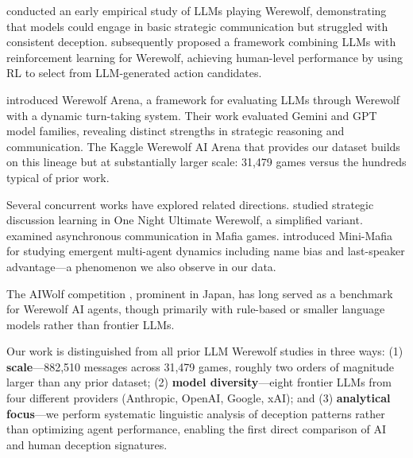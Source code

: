 \citet{xu2023exploring} conducted an early empirical study of LLMs playing Werewolf, demonstrating that models could engage in basic strategic communication but struggled with consistent deception. \citet{xu2024language} subsequently proposed a framework combining LLMs with reinforcement learning for Werewolf, achieving human-level performance by using RL to select from LLM-generated action candidates.

\citet{bailis2024werewolf} introduced Werewolf Arena, a framework for evaluating LLMs through Werewolf with a dynamic turn-taking system. Their work evaluated Gemini and GPT model families, revealing distinct strengths in strategic reasoning and communication. The Kaggle Werewolf AI Arena that provides our dataset builds on this lineage but at substantially larger scale: 31,479 games versus the hundreds typical of prior work.

Several concurrent works have explored related directions. \citet{jin2025learning} studied strategic discussion learning in One Night Ultimate Werewolf, a simplified variant. \citet{eckhaus2025timetotalk} examined asynchronous communication in Mafia games. \citet{costa2025minimafia} introduced Mini-Mafia for studying emergent multi-agent dynamics including name bias and last-speaker advantage---a phenomenon we also observe in our data.

The AIWolf competition \citep{toriumi2017aiwolf}, prominent in Japan, has long served as a benchmark for Werewolf AI agents, though primarily with rule-based or smaller language models rather than frontier LLMs.

Our work is distinguished from all prior LLM Werewolf studies in three ways: (1) \textbf{scale}---882,510 messages across 31,479 games, roughly two orders of magnitude larger than any prior dataset; (2) \textbf{model diversity}---eight frontier LLMs from four different providers (Anthropic, OpenAI, Google, xAI); and (3) \textbf{analytical focus}---we perform systematic linguistic analysis of deception patterns rather than optimizing agent performance, enabling the first direct comparison of AI and human deception signatures.
